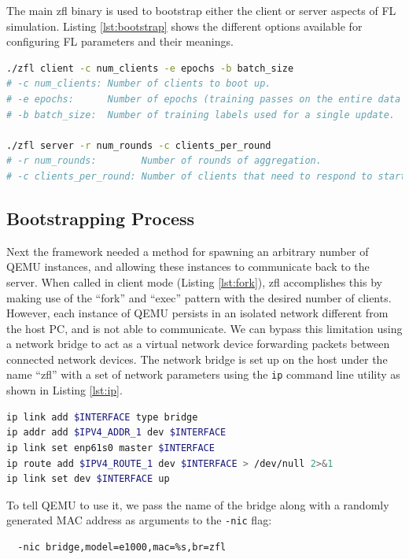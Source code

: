 \documentclass[12pt]{article}
\begin{document}
The main zfl binary is used to bootstrap either the client or server aspects of FL simulation.
Listing \ref{lst:bootstrap} shows the different options available for configuring FL parameters and
their meanings.
\begin{lstlisting}[language=bash,caption={The main zfl binary},label={lst:bootstrap}]
./zfl client -c num_clients -e epochs -b batch_size
# -c num_clients: Number of clients to boot up.
# -e epochs:      Number of epochs (training passes on the entire data set).
# -b batch_size:  Number of training labels used for a single update.

./zfl server -r num_rounds -c clients_per_round
# -r num_rounds:        Number of rounds of aggregation.
# -c clients_per_round: Number of clients that need to respond to start a round.
\end{lstlisting}

\subsection{Bootstrapping Process}
Next the framework needed a method for spawning an arbitrary number of QEMU instances, and allowing
these instances to communicate back to the server. When called in client mode (Listing
\ref{lst:fork}), zfl accomplishes this
by making use of the ``fork'' and ``exec'' pattern with the desired number of clients. \\

However, each instance of QEMU persists in an isolated network different from the host PC,
and is not able to communicate. We can bypass this limitation using a network bridge to act as a
virtual network device forwarding packets between connected network devices.
The network bridge is set up on the host under the name ``zfl'' with a set of network parameters using
the \verb|ip| command line utility as shown in Listing \ref{lst:ip}.
\begin{lstlisting}[language=bash,caption=Network bridge setup,label={lst:ip}]
ip link add $INTERFACE type bridge
ip addr add $IPV4_ADDR_1 dev $INTERFACE
ip link set enp61s0 master $INTERFACE
ip route add $IPV4_ROUTE_1 dev $INTERFACE > /dev/null 2>&1
ip link set dev $INTERFACE up
\end{lstlisting}
To tell QEMU to use it, we pass the name of the bridge along
with a randomly generated MAC address as arguments to the \verb|-nic| flag:
\begin{verbatim}
  -nic bridge,model=e1000,mac=%s,br=zfl
\end{verbatim}
\end{document}
